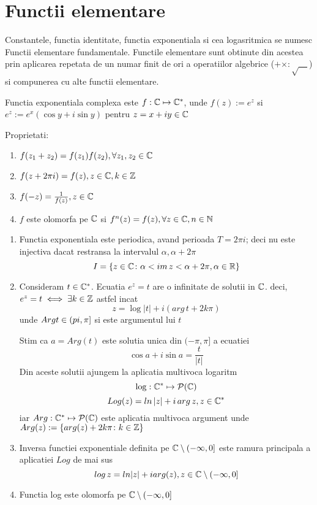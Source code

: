 \section{Functii elementare}

\begin{definition}
    Constantele, functia identitate, functia exponentiala si cea logasritmica se numesc
    Functii elementare fundamentale. Functile elementare sunt obtinute din acestea prin
    aplicarea repetata de un numar finit de ori a operatiilor algebrice
    ($ + \times : \sqrt{\quad}$) si compunerea cu alte functii elementare.
\end{definition}

\begin{observation}\leavevmode
    Functia exponentiala complexa este $f:\mathbb{C} \mapsto \mathbb{C}^*$, unde $f(z):=e^z$ si
    $e^z:=e^x(\cos y + i\sin y)$ pentru $z=x+iy \in \mathbb{C}$

    Proprietati:
    
		\begin{enumerate}
				\item $f(z_1+z_2) = f(z_1) f(z_2), \forall z_1,z_2\in \mathbb{C} $
				\item $f(z+2\pi i) = f(z) , z\in \mathbb{C}, k\in \mathbb{Z} $
				\item $f(-z) = \frac{1}{f(z)}, z \in \mathbb{C} $
				\item $f$ este olomorfa pe $\mathbb{C}$ si $f^{n}(z) = f(z)
				,\forall z \in \mathbb{C}, n \in \mathbb{N} $
    \end{enumerate}    
\end{observation}

\begin{observation}\leavevmode
    \begin{enumerate}
        \item Functia exponentiala este periodica, avand perioada $T=2\pi i$; deci nu
        este injectiva dacat restransa la intervalul $\alpha, \alpha+2\pi$
        \[ I = \{z \in \mathbb{C} \colon \alpha < im\,z < \alpha + 2 \pi, \alpha \in \mathbb{R} \} \]
        \item Consideram $t \in \mathbb{C}^*$. Ecuatia $e^z=t$ are o infinitate de solutii in
        $\mathbb{C}$. deci, $e^z=t \iff \exists k\in\mathbb{Z}$ astfel incat
        \[z=\log | t | + i(arg\,t +2k\pi)\]
        unde $Arg t \in (\-pi, \pi]$ si este argumentul lui $t$

        Stim ca $a=Arg(t)$ este solutia unica din $(-\pi, \pi]$ a ecuatiei
        \[\cos a + i \sin a = \frac{t}{|t|}\]
        Din aceste solutii ajungem la aplicatia multivoca logaritm
        \[\log:\mathbb{C}^*\mapsto \mathcal{P}(\mathbb{C})\]
        \[Log(z) = ln\,|z| + i\, arg\,z, z \in \mathbb{C}^*\]
        iar $Arg: \mathbb{C}^* \mapsto \mathcal{P}(\mathbb{C})$ este aplicatia multivoca argument
        unde $Arg(z):= \{arg(z) + 2k \pi \colon k \in \mathbb{Z}\}$

        \item Inversa functiei exponentiale definita pe $\mathbb{C}\setminus(-\infty,0]$ este ramura
        principala  a aplicatiei $Log$ de mai sus
        \[log\,z = ln|z| + i arg(z), z\in\mathbb{C}\setminus(-\infty,0]\]
        \item Functia log este olomorfa pe $\mathbb{C}\setminus(-\infty,0]$
    \end{enumerate}
\end{observation}